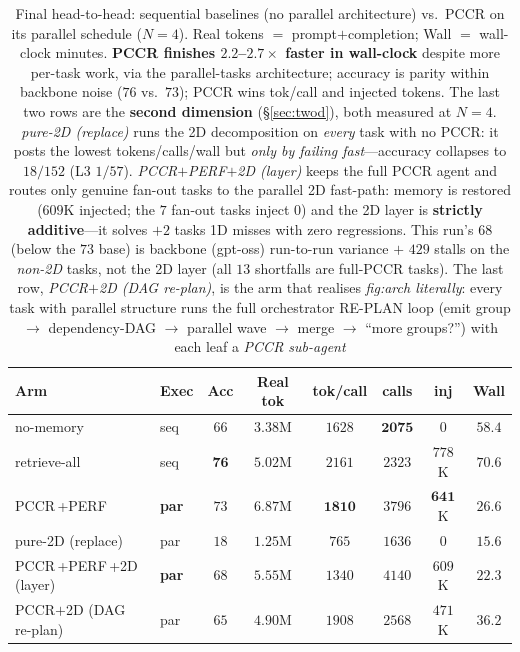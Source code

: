\documentclass[10pt,twocolumn]{article}
\begin{document}
\begin{table}[t]
\centering\small
\setlength{\tabcolsep}{3.5pt}
\begin{tabular}{@{}llcccccc@{}}
\toprule
Arm & Exec & Acc & Real tok & tok/call & calls & inj & Wall \\
\midrule
no-memory    & seq & $66$ & $\mathbf{3.38}$M & $1628$ & $\mathbf{2075}$ & $0$ & $58.4$ \\
retrieve-all & seq & $\mathbf{76}$ & $5.02$M & $2161$ & $2323$ & $778$K & $70.6$ \\
PCCR\,+PERF  & \textbf{par} & $73$ & $6.87$M & $\mathbf{1810}$ & $3796$ & $\mathbf{641}$K & $\mathbf{26.6}$ \\
pure-2D (replace) & par & $18$ & $1.25$M & $765$ & $1636$ & $0$ & $15.6$ \\
PCCR\,+PERF\,+2D (layer) & \textbf{par} & $68$ & $5.55$M & $1340$ & $4140$ & $609$K & $22.3$ \\
PCCR$+$2D (DAG re-plan) & par & $65$ & $4.90$M & $1908$ & $2568$ & $471$K & $36.2$ \\
\bottomrule
\end{tabular}
\caption{Final head-to-head: sequential baselines (no parallel architecture) vs.\ PCCR on its
parallel schedule ($N{=}4$). Real tokens $=$ prompt$+$completion; Wall $=$ wall-clock minutes.
\textbf{PCCR finishes $2.2$--$2.7\times$ faster in wall-clock} despite more per-task work, via the
parallel-tasks architecture; accuracy is parity within backbone noise ($76$ vs.\ $73$); PCCR wins
tok/call and injected tokens. The last two rows are the \textbf{second dimension} (\S\ref{sec:twod}),
both measured at $N{=}4$. \emph{pure-2D (replace)} runs the 2D decomposition on \emph{every} task with
no PCCR: it posts the lowest tokens/calls/wall but \emph{only by failing fast}---accuracy collapses to
$18/152$ (L3 $1/57$). \emph{PCCR$+$PERF$+$2D (layer)} keeps the full PCCR agent and routes only genuine
fan-out tasks to the parallel 2D fast-path: memory is restored ($609$K injected; the $7$ fan-out tasks
inject $0$) and the 2D layer is \textbf{strictly additive}---it solves $+2$ tasks 1D misses with zero
regressions. This run's $68$ (below the $73$ base) is backbone (gpt-oss) run-to-run variance $+$ $429$
stalls on the \emph{non-2D} tasks, not the 2D layer (all $13$ shortfalls are full-PCCR tasks). The
last row, \emph{PCCR$+$2D (DAG re-plan)}, is the arm that realises \emph{fig:arch literally}: every
task with parallel structure runs the full orchestrator RE-PLAN loop (emit group $\to$ dependency-DAG
$\to$ parallel wave $\to$ merge $\to$ ``more groups?'') with each leaf a \emph{PCCR sub-agent}
}
\end{table}
\end{document}
